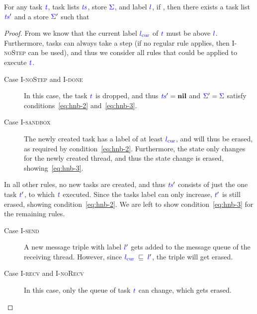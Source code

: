 \documentclass{llncs}
\newcommand{\Varid}[1]{\mathit{#1}}
\begin{document}
\begin{lemma}
  \label{lemma:high-not-blocking}
  For any task \ensuremath{\ifc{\Varid{t}}}, task lists \ensuremath{\ifc{\Varid{ts}}}, store \ensuremath{\ifc{\Sigma}}, and label \ensuremath{\ifc{l}}, if
  , then there exists a task list
  \ensuremath{\ifc{\Varid{ts}}'} and a store \ensuremath{\ifc{\Sigma}'} such that
  
\end{lemma}
\begin{proof}
  From  we know that the current label \ensuremath{\lcurr} of \ensuremath{\ifc{\Varid{t}}}
  must be above \ensuremath{\ifc{l}}.  Furthermore, tasks can always take a step (if no
  regular rule applies, then \textsc{I-noStep} can be used), and thus
  we consider all rules that could be applied to execute \ensuremath{\ifc{\Varid{t}}}.
  \begin{description}
    \item[Case \textsc{I-noStep} and \textsc{I-done}]
    In this case, the task \ensuremath{\ifc{\Varid{t}}} is dropped,
    and thus \ensuremath{\ifc{\Varid{ts}}'\mathrel{=}\mathbf{nil}} and \ensuremath{\ifc{\Sigma}'\mathrel{=}\ifc{\Sigma}} satisfy
    conditions~\eqref{eq:hnb-2} and~\eqref{eq:hnb-3}.
    \item[Case \textsc{I-sandbox}]
    The newly created task has a label of at least \ensuremath{\lcurr}, and will thus be
    erased, as required by condition~\eqref{eq:hnb-2}.  Furthermore, the
    state only changes for the newly created thread, and thus the state
    change is erased, showing~\eqref{eq:hnb-3}.
  \end{description}
  In all other rules, no new tasks are created, and thus \ensuremath{\ifc{\Varid{ts}}'} consists of just
  the one task \ensuremath{\ifc{\Varid{t}}'}, to which \ensuremath{\ifc{\Varid{t}}} executed.  Since the tasks label can
  only increase, \ensuremath{\ifc{\Varid{t}}'} is still erased, showing condition~\eqref{eq:hnb-2}.
  We are left to show condition~\eqref{eq:hnb-3} for the remaining rules.
  \begin{description}
    \item[Case \textsc{I-send}]
    A new message triple with label \ensuremath{\ifc{l}'} gets added to the message
    queue of the receiving thread.  However, since \ensuremath{\lcurr\;\flows{}\;\ifc{l}'},
    the triple will get erased.
    \item[Case \textsc{I-recv} and \textsc{I-noRecv}]
    In this case, only the queue of
    task \ensuremath{\ifc{\Varid{t}}} can change, which gets erased.

\end{description}
\end{proof}
\end{document}

